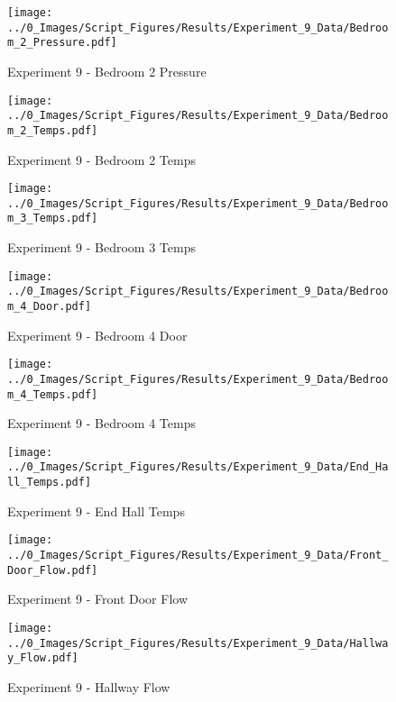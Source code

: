 	\clearpage

	\begin{figure}[H]
		\centering
		\texttt{[image: ../0\_Images/Script\_Figures/Results/Experiment\_9\_Data/Bedroom\_2\_Pressure.pdf]}
		\caption[]{Experiment 9 - Bedroom 2 Pressure}
	\end{figure}
 

	\begin{figure}[H]
		\centering
		\texttt{[image: ../0\_Images/Script\_Figures/Results/Experiment\_9\_Data/Bedroom\_2\_Temps.pdf]}
		\caption[]{Experiment 9 - Bedroom 2 Temps}
	\end{figure}
 
	\clearpage

	\begin{figure}[H]
		\centering
		\texttt{[image: ../0\_Images/Script\_Figures/Results/Experiment\_9\_Data/Bedroom\_3\_Temps.pdf]}
		\caption[]{Experiment 9 - Bedroom 3 Temps}
	\end{figure}
 

	\begin{figure}[H]
		\centering
		\texttt{[image: ../0\_Images/Script\_Figures/Results/Experiment\_9\_Data/Bedroom\_4\_Door.pdf]}
		\caption[]{Experiment 9 - Bedroom 4 Door}
	\end{figure}
 
	\clearpage

	\begin{figure}[H]
		\centering
		\texttt{[image: ../0\_Images/Script\_Figures/Results/Experiment\_9\_Data/Bedroom\_4\_Temps.pdf]}
		\caption[]{Experiment 9 - Bedroom 4 Temps}
	\end{figure}
 

	\begin{figure}[H]
		\centering
		\texttt{[image: ../0\_Images/Script\_Figures/Results/Experiment\_9\_Data/End\_Hall\_Temps.pdf]}
		\caption[]{Experiment 9 - End Hall Temps}
	\end{figure}
 
	\clearpage

	\begin{figure}[H]
		\centering
		\texttt{[image: ../0\_Images/Script\_Figures/Results/Experiment\_9\_Data/Front\_Door\_Flow.pdf]}
		\caption[]{Experiment 9 - Front Door Flow}
	\end{figure}
 

	\begin{figure}[H]
		\centering
		\texttt{[image: ../0\_Images/Script\_Figures/Results/Experiment\_9\_Data/Hallway\_Flow.pdf]}
		\caption[]{Experiment 9 - Hallway Flow}
	\end{figure}
 
